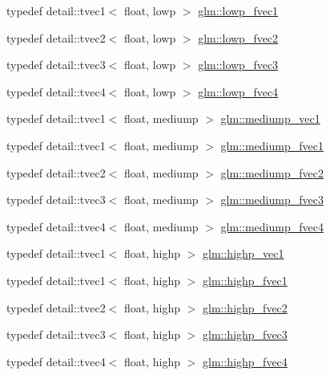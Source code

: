 \begin{DoxyCompactItemize}
\item 
typedef detail\+::tvec1$<$ float, lowp $>$ \hyperlink{group__gtc__type__precision_gad5266f0507395cf8cdfe84b9cf5496e4}{glm\+::lowp\+\_\+fvec1}
\item 
typedef detail\+::tvec2$<$ float, lowp $>$ \hyperlink{group__gtc__type__precision_gaf365442c52322b810bc0ed943e539229}{glm\+::lowp\+\_\+fvec2}
\item 
typedef detail\+::tvec3$<$ float, lowp $>$ \hyperlink{group__gtc__type__precision_ga83d77dfe136d4add9e214cd205320c12}{glm\+::lowp\+\_\+fvec3}
\item 
typedef detail\+::tvec4$<$ float, lowp $>$ \hyperlink{group__gtc__type__precision_ga0d016cdbff067c450122115d0620bf85}{glm\+::lowp\+\_\+fvec4}
\item 
typedef detail\+::tvec1$<$ float, mediump $>$ \hyperlink{group__gtc__type__precision_ga1b734d715033ab3026b2fb27e1fb7d3e}{glm\+::mediump\+\_\+vec1}
\item 
typedef detail\+::tvec1$<$ float, mediump $>$ \hyperlink{group__gtc__type__precision_ga4534af301d5260974cee29f76842d579}{glm\+::mediump\+\_\+fvec1}
\item 
typedef detail\+::tvec2$<$ float, mediump $>$ \hyperlink{group__gtc__type__precision_ga5c2686caa6838515f6727eea1b64aa05}{glm\+::mediump\+\_\+fvec2}
\item 
typedef detail\+::tvec3$<$ float, mediump $>$ \hyperlink{group__gtc__type__precision_ga710c3af5ebb05e5e863cff78affd25a6}{glm\+::mediump\+\_\+fvec3}
\item 
typedef detail\+::tvec4$<$ float, mediump $>$ \hyperlink{group__gtc__type__precision_gaba16de142de00531a1598d83716c6939}{glm\+::mediump\+\_\+fvec4}
\item 
typedef detail\+::tvec1$<$ float, highp $>$ \hyperlink{group__gtc__type__precision_gab3f08c031846e7a95b49e81c48d920d3}{glm\+::highp\+\_\+vec1}
\item 
typedef detail\+::tvec1$<$ float, highp $>$ \hyperlink{group__gtc__type__precision_ga5d9f2208253856df60a57925f92ff0c8}{glm\+::highp\+\_\+fvec1}
\item 
typedef detail\+::tvec2$<$ float, highp $>$ \hyperlink{group__gtc__type__precision_gab58ecc53699d45f4f88d67bbff084c54}{glm\+::highp\+\_\+fvec2}
\item 
typedef detail\+::tvec3$<$ float, highp $>$ \hyperlink{group__gtc__type__precision_ga79b821fc8ae989b12bb43e2cd3932580}{glm\+::highp\+\_\+fvec3}
\item 
typedef detail\+::tvec4$<$ float, highp $>$ \hyperlink{group__gtc__type__precision_gae0de2413648d89bf5a8e598e5520a439}{glm\+::highp\+\_\+fvec4}

\end{DoxyCompactItemize}
